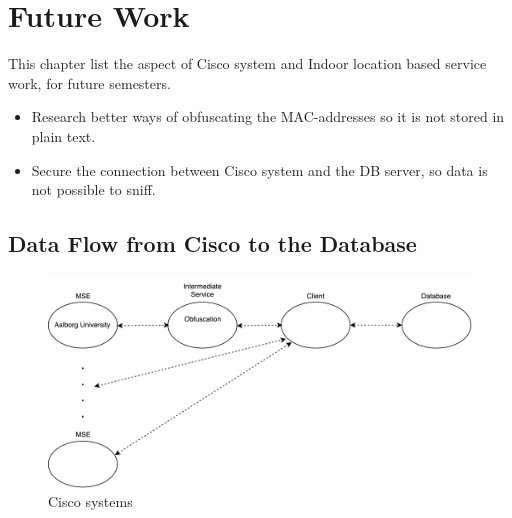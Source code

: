 \chapter{Future Work}
\label{Cha:Future_Work}
This chapter list the aspect of Cisco system and Indoor location based service work, for future semesters.

\begin{itemize}
	\item Research better ways of obfuscating the MAC-addresses so it is not stored in plain text.
	\item Secure the connection between Cisco system and the DB server, so data is not possible to sniff.
\end{itemize}


\section{Data Flow from Cisco to the Database}\label{sec:data_flow}
\begin{figure}[ht]
	\begin{center}
		\includegraphics[scale=0.7]{graphics/ciscoNew.pdf}
		\caption{Cisco systems}
		\label{fig:cisco_systems}
	\end{center} 
\end{figure}

